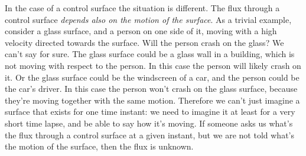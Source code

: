 \documentclass[a4paper,12pt,%
onecolumn,oneside,%
british%
]{memoir}
\renewcommand*{\|}[1][]{\nonscript\:#1\vert\nonscript\:\mathopen{}}
\begin{document}
% 
%
In the case of a control surface the situation is different. The flux through a control surface \emph{depends also on the motion of the surface}. As a trivial example, consider a glass surface, and a person on one side of it, moving with a high velocity directed towards the surface. Will the person crash on the glass? We can't say for sure. The glass surface could be a glass wall in a building, which is not moving with respect to the person. In this case the person will likely crash on it. Or the glass surface could be the windscreen of a car, and the person could be the car's driver. In this case the person won't crash on the glass surface, because they're moving together with the same motion. Therefore we can't just imagine a surface that exists for one time instant: we need to imagine it at least for a very short time lapse, and be able to say how it's moving. If someone asks us what's the flux through a control surface at a given instant, but we are not told what's the motion of the surface, then the flux is unknown.
\end{document}
